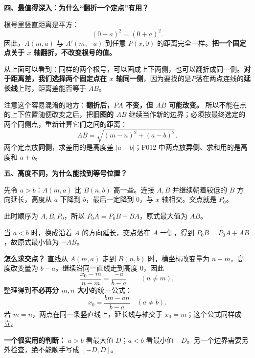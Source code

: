 \clearpage
\begin{explanationbox}
	\textbf{\textcolor{CExplanation}{四、最值得深入：为什么“翻折一个定点”有用？}}

	根号里竖直距离是平方：
	\[
		(0-a)^2=(0+a)^2.
	\]
	因此，$A(m,a)$ 与 $A'(m,-a)$ 到任意 $P(x,0)$ 的距离完全一样。\textbf{把一个固定点关于 $x$ 轴翻折，不改变根号的值。}

	

	从上面可以看到：同样的两个根号，可以画成上下两侧，也可以翻折成同一侧。\textbf{对于距离差，我们选择两个固定点在 $x$ 轴同一侧}，因为要找的是$P$落在两点连线的\textbf{延长线}上时，距离差能否等于 $AB$。

	注意这个容易混淆的地方：\textbf{翻折后，$PA$ 不变，但 $AB$ 可能改变。} 所以不能在点的上下位置随便改变之后，把\textbf{旧图的 $AB$} 继续当作新的边界；必须按最终选定的两个同侧点，重新计算它们之间的距离：
	\[
		AB=\sqrt{(m-n)^2+(a-b)^2}.
	\]
	两个定点放\textbf{同侧}，求差用的是高度差 $|a-b|$；F012 中两点放\textbf{异侧}、求和用的是高度和 $a+b$。
\end{explanationbox}
\clearpage
\begin{explanationbox}
	\textbf{\textcolor{CExplanation}{五、高度不同，为什么能找到等号位置？}}



	先令 $a>b$：$A(m,a)$ 比 $B(n,b)$ 高一些。连接 $A,B$ 并继续朝着较低的 $B$ 方向延长，高度从 $a$ 下降到 $b$，最后一定降到 $0$，与 $x$ 轴相交。交点就是 $P_0$。

	此时顺序为 $A,B,P_0$，所以 $P_0A=P_0B+BA$，原式最大值为 $AB$。

	当 $a<b$ 时，换成沿着 $A$ 的方向延长，交点落在 $A$ 一侧，得到 $P_0B=P_0A+AB$，故原式最小值为 $-AB$。

	\textbf{怎么求交点？} 直线从 $A(m,a)$ 走到 $B(n,b)$ 时，横坐标改变量为 $n-m$，高度改变量为 $b-a$。继续沿同一直线走到高度 $0$，因此
	\[
		\frac{x_0-m}{n-m}=\frac{-a}{b-a}\qquad(n\ne m),
	\]
	整理得到\textbf{不必再分 $m,n$ 大小}的统一公式：
	\[
		\boxed{x_0=\frac{bm-an}{b-a}\quad(a\ne b)}.
	\]
	若 $m=n$，两点在同一条竖直线上，延长线与轴交于 $x_0=m$；这个公式同样成立。

	\textbf{一个很实用的判断：} $a>b$ 看最大值 $D$；$a<b$ 看最小值 $-D$。另一个边界需要另外检查，绝不能顺手写成 $[-D,D]$。
\end{explanationbox}
\clearpage
